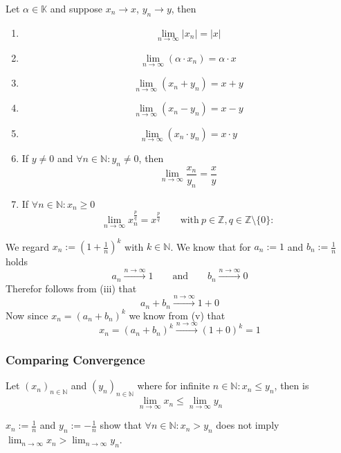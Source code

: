 \begin{proposition}
   Let \(\alpha \in \mathbb{K}\) and suppose \(x_n \to x\), \(y_n \to y\), then
   \begin{enumerate}[label=\roman*, align=Center]
      \item \[\lim_{n \to \infty} \lvert x_n\rvert = \lvert x \rvert\]
      \item \[\lim_{n \to \infty} (\alpha \cdot x_n) = \alpha \cdot x\]
      \item \[\lim_{n \to \infty} (x_n + y_n) = x + y\]
      \item \[\lim_{n \to \infty} (x_n - y_n) = x - y\]
      \item \[\lim_{n \to \infty} (x_n \cdot y_n) = x \cdot y\]
      \item If \(y \neq 0\) and \(\forall n \in \mathbb{N}: y_n \neq 0\), then
         \[\lim_{n \to \infty} \frac{x_n}{y_n} = \frac{x}{y}\]
      \item If \(\forall n \in \mathbb{N}: x_n \geq 0\)
         \[\lim_{n \to \infty} x_n^{\frac{p}{q}} = x^{\frac{p}{q}} \qquad\text{with}~p \in \mathbb{Z}, q \in \mathbb{Z} \setminus \{0\}: \]
   \end{enumerate}
\end{proposition}
\begin{example}
   We regard \(x_n := \left(1 + \frac{1}{n}\right)^k\) with \(k \in \mathbb{N}\).
   We know that for \(a_n := 1\) and \(b_n := \frac{1}{n}\) holds
   \[a_n \xrightarrow{n \to \infty} 1 \qquad\text{and}\qquad b_n \xrightarrow{n \to \infty} 0\]
   Therefor follows from (iii) that
   \[a_n + b_n \xrightarrow{n \to \infty} 1 + 0\]
   Now since \(x_n = (a_n + b_n)^k\) we know from (v) that
   \[x_n = (a_n + b_n)^k \xrightarrow{n \to \infty} (1+0)^k = 1\]
\end{example}

\subsubsection{Comparing Convergence}
\begin{proposition}\label{pro:limit_comp}
   Let \((x_n)_{n \in \mathbb{N}}\) and \((y_n)_{n \in \mathbb{N}}\) where for infinite \(n \in \mathbb{N}: x_n \leq y_n\), then is
   \[\lim_{n \to \infty} x_n \leq \lim_{n \to \infty} y_n\]
\end{proposition}
\begin{remark}
   \(x_n := \frac{1}{n}\) and \(y_n := -\frac{1}{n}\) show that \(\forall n \in \mathbb{N}: x_n > y_n\) does not imply \(\lim_{n \to \infty} x_n > \lim_{n \to \infty} y_n\).
\end{remark}

